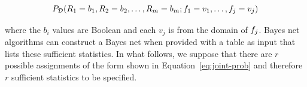 \documentclass{article}
\begin{document}
\begin{equation} \label{eq:joint-prob}
P_{\mathcal{D}}(R_{1} = b_{1}, R_{2} = b_{2},\ldots, R_{m} = b_{m}; f_{1} = v_{1},\ldots,f_{j} = v_{j})
\end{equation}

where the $b_{i}$ values are Boolean and each $v_{j}$ is from the domain of $f_{j}$. 
Bayes net algorithms can construct a Bayes net when provided with a table as input that lists these sufficient statistics. In what follows, we suppose that there are $r$ possible assignments of the form shown in Equation~\eqref{eq:joint-prob} and therefore $r$ sufficient statistics to be specified.

\end{document}

